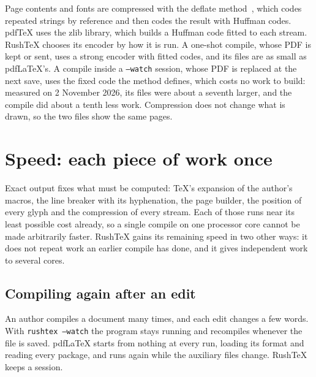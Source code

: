 \documentclass{article}
\numberwithin{equation}{section}
\theoremstyle{definition}
\theoremstyle{remark}
\begin{document}
Page contents and fonts are compressed with the deflate method~\cite{deutsch96}, which
codes repeated strings by reference and then codes the result with Huffman codes. pdfTeX
uses the zlib library, which builds a Huffman code fitted to each stream. RushTeX chooses
its encoder by how it is run. A one-shot compile, whose PDF is kept or sent, uses a strong
encoder with fitted codes, and its files are as small as pdfLaTeX's. A compile inside a
\texttt{--watch} session, whose PDF is replaced at the next save, uses the fixed code the
method defines, which costs no work to build: measured on 2 November 2026, its files were
about a seventh larger, and the compile did about a tenth less work. Compression does not change what is drawn, so
the two files show the same pages.

\section{Speed: each piece of work once}\label{sec:speed}

Exact output fixes what must be computed: \TeX's expansion of the author's macros, the
line breaker with its hyphenation, the page builder, the position of every glyph and the
compression of every stream. Each of those runs near its least possible cost already,
so a single compile on one processor core cannot be made arbitrarily faster. RushTeX
gains its remaining speed in two other ways: it does not repeat work an earlier compile
has done, and it gives independent work to several cores.

\subsection{Compiling again after an edit}

An author compiles a document many times, and each edit changes a few words. With
\texttt{rushtex --watch} the program stays running and recompiles whenever the file is
saved. pdfLaTeX starts from nothing at every run, loading its format and reading every
package, and runs again while the auxiliary files change. RushTeX keeps a session.
\end{document}
